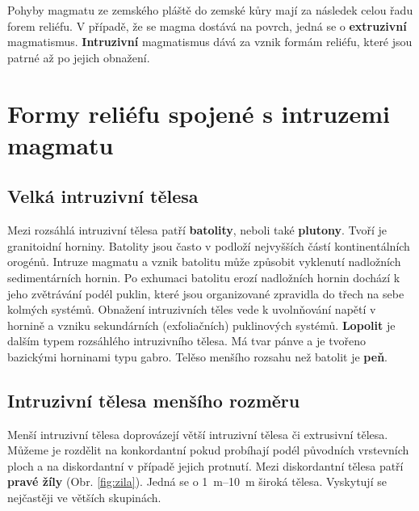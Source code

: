 Pohyby magmatu ze zemského pláště do zemské kůry mají za následek celou řadu forem reliéfu. V případě, že se magma dostává na povrch, jedná se o \textbf{extruzivní} magmatismus.  \textbf{Intruzivní} magmatismus dává za vznik formám reliéfu, které jsou patrné až po jejich obnažení.

\section{Formy reliéfu spojené s intruzemi magmatu}
\subsection{Velká intruzivní tělesa}
Mezi rozsáhlá intruzivní tělesa patří \textbf{batolity}, neboli také \textbf{plutony}. Tvoří je granitoidní horniny. Batolity jsou často v podloží nejvyšších částí kontinentálních orogénů. Intruze magmatu a vznik batolitu může způsobit vyklenutí nadložních sedimentárních hornin. Po exhumaci batolitu erozí nadložních hornin dochází k jeho zvětrávání podél puklin, které jsou organizované zpravidla do třech na sebe kolmých systémů. Obnažení intruzivních těles vede k uvolnňování napětí v hornině a vzniku sekundárních (exfoliačních) puklinových systémů. \textbf{Lopolit} je dalším typem rozsáhlého intruzivního tělesa. Má tvar pánve a je tvořeno bazickými horninami typu gabro. Telěso menšího rozsahu než batolit je \textbf{peň}.

\subsection{Intruzivní tělesa menšího rozměru}
Menší intruzivní tělesa doprovázejí větší intruzivní tělesa či extrusivní tělesa. Můžeme je rozdělit na konkordantní pokud probíhají podél původních vrstevních ploch a na diskordantní v případě jejich protnutí. Mezi diskordantní tělesa patří \textbf{pravé žíly} (Obr. \ref{fig:zila}). Jedná se o \SIrange{1}{10}{\metre} široká tělesa. Vyskytují se nejčastěji ve větších skupinách.

